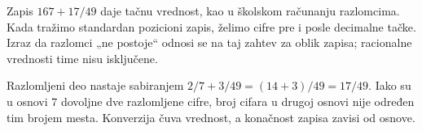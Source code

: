 
Zapis $167+17/49$ daje tačnu vrednost, kao u školskom računanju razlomcima. Kada tražimo standardan pozicioni zapis, želimo cifre pre i posle decimalne tačke. Izraz da razlomci „ne postoje“ odnosi se na taj zahtev za oblik zapisa; racionalne vrednosti time nisu isključene.

Razlomljeni deo nastaje sabiranjem $2/7+3/49=(14+3)/49=17/49$. Iako su u osnovi $7$ dovoljne dve razlomljene cifre, broj cifara u drugoj osnovi nije određen tim brojem mesta. Konverzija čuva vrednost, a konačnost zapisa zavisi od osnove.
